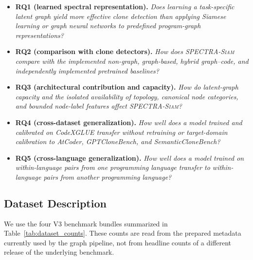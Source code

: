 \documentclass[authoryear,final,5p,times,twocolumn]{elsarticle}
\newcommand{\method}{\textsc{SPECTRA-Siam}}
\newcommand{\added}[1]{{\color{green!50!black}#1}}
\theoremstyle{plain}
\begin{document}
\begin{itemize}[leftmargin=*]
\item \textbf{RQ1 (learned spectral representation).}
\emph{Does learning a task-specific latent graph yield more effective clone
detection than applying Siamese learning or graph neural networks to predefined
program-graph representations?}

\item \textbf{RQ2 (comparison with clone detectors).}
\emph{How does \method{} compare with the implemented non-graph, graph-based,
hybrid graph--code, and independently implemented pretrained baselines?}

\item \added{\textbf{RQ3 (architectural contribution and capacity).}
\emph{How do latent-graph capacity and the isolated availability of topology,
canonical node categories, and bounded node-label features affect \method{}?}}

\item \added{\textbf{RQ4 (cross-dataset generalization).}
\emph{How well does a model trained and calibrated on CodeXGLUE transfer without
retraining or target-domain calibration to AtCoder, GPTCloneBench, and
SemanticCloneBench?}}

\item \textbf{RQ5 (cross-language generalization).}
\emph{How well does a model trained on within-language pairs from one programming
language transfer to within-language pairs from another programming language?}
\end{itemize}

\subsection{Dataset Description}
\label{sec:datasets}

We use the four V3 benchmark bundles summarized in
Table~\ref{tab:dataset_counts}. These counts are read from the prepared
metadata currently used by the graph pipeline, not from headline counts of a
different release of the underlying benchmark.
\end{document}
